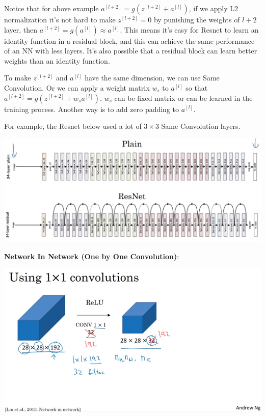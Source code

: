 \documentclass{article}
\begin{document}
\noindent Notice that for above example \(a^{[l + 2]} = g(z^{[l + 2]} + a^{[l]})\), if we apply L2 normalization it's not hard to make \(z^{[l + 2]} = 0\) by punishing the weights of \(l + 2\) layer, then \(a^{[l + 2]} = g(a^{[l]}) \approx a^{[l]}\). This means it's easy for Resnet to learn an identity function in a residual block, and this can achieve the same performance of an NN with less layers. It's also possible that a residual block can learn better weights than an identity function.

\bigskip

\noindent To make \(z^{[l + 2]}\) and \(a^{[l]}\) have the same dimension, we can use Same Convolution. Or we can apply a weight matrix \(w_{s}\) to \(a^{[l]}\) so that \(a^{[l + 2]} = g(z^{[l + 2]} + w_{s} a^{[l]})\). \(w_{s}\) can be fixed matrix or can be learned in the training process. Another way is to add zero padding to \(a^{[l]}\).

\bigskip

\noindent For example, the Resnet below used a lot of \(3 \times 3\) Same Convolution layers.

\begin{center}
\includegraphics[scale=0.25]{./images/resnet_compare.png}
\end{center}

\noindent \textbf{Network In Network (One by One Convolution)}:

\begin{center}
\includegraphics[scale=0.3]{./images/network_in_network.png}
\end{center}
\end{document}
